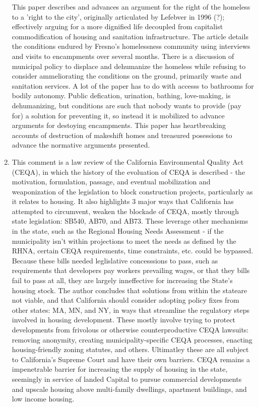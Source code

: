\documentclass{article}
\begin{document}
\begin{enumerate}
This paper describes and advances an argument for the right of the
homeless to a 'right to the city', originally articulated by Lefebver
in 1996 (?); effectively arguing for a more dignified life decoupled
from capitalist commodification of housing and sanitation
infrastructure. The article details the conditions endured by Fresno's
homelessness community using interviews and visits to encampments over
several months. There is a discussion of municipal policy to displace
and dehumanize the homeless while refusing to consider ammeliorating
the conditions on the ground, primarily waste and sanitation
services. A lot of the paper has to do with accesss to bathrooms for
bodily autonomy. Public defication, urination, bathing, love-making,
is dehumanizing, but conditions are such that nobody wants to provide
(pay for) a solution for preventing it, so instead it is mobilized to
advance arguments for destoying encampments. This paper has
heartbreaking accounts of destruction of makeshift homes and treasured
posessions to advance the normative arguments presented.

  
\item \cite{dewitt2022TwistedFate}

This comment is a law review of the California Environmental Quality
Act (CEQA), in which the history of the evoluation of CEQA is
described - the motivation, formulation, passage, and eventual
mobilization and weaponization of the legislation to block
construction projects, particularly as it relates to housing. It also
highlights 3 major ways that California has attempted to circumvent,
weaken the blockade of CEQA, mostly through state legislation: SB540,
AB70, and AB73. These leverage other mechanisms in the state, such as
the Regional Housing Needs Assessment - if the municipality isn't
within projections to meet the needs as defined by the RHNA, certain
CEQA requirements, time constraints, etc. could be bypassed. Because
these bills needed leglislative concesssions to pass, such as
requirements that developers pay workers prevailing wages, or that
they bills fail to pass at all, they are largely inneffective for
increasing the State's housing stock. The author concludes that
solutions from within the stateare not viable, and that California
should consider adopting policy fixes from other states: MA, MN, and
NY, in ways that streamline the regulatory steps involved in housing
development. These mostly involve trying to protect developments from
frivolous or otherwise counterproductive CEQA lawsuits: removing
anonymity, creating municipality-specific CEQA processes, enacting
housing-friendly zoning statutes, and others. Ultimatley these are all
subject to California's Supreme Court and have their own
barriers. CEQA remains a impenetrable barrier for increasing the
supply of housing in the state, seemingly in service of landed Capital
to pursue commercial developments and upscale housing above
multi-family dwellings, apartment buildings, and low income housing.


\end{enumerate}
\end{document}
